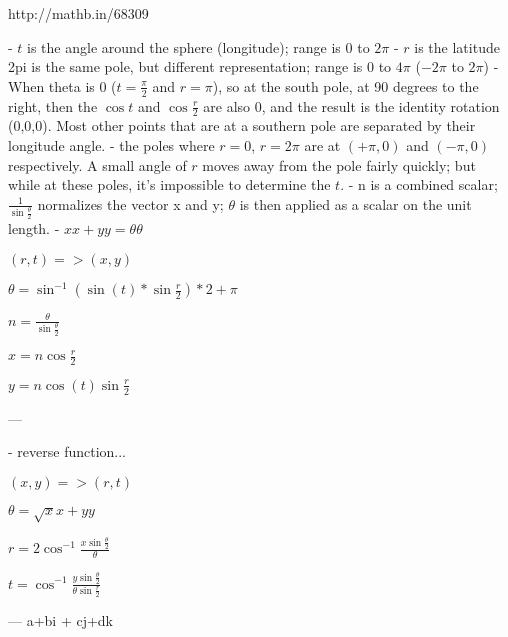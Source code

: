 http://mathb.in/68309

- $t$ is the angle around the sphere (longitude); range is $0$ to $2\pi$ 
- $r$ is the latitude 2pi is the same pole, but different representation; range is $0$ to $4\pi$ ($-2\pi$ to $2\pi$)
- When theta is 0 ($t=\frac \pi 2$ and $r=\pi$), so at the south pole, at 90 degrees to the right, then the $\cos t$ and $\cos \frac r 2 $ are also 0, and the result is the identity rotation (0,0,0).  Most other points that are at a southern pole are separated by their longitude angle.  
- the poles where $r=0$, $r=2\pi$ are at $(+\pi,0)$ and $(-\pi,0)$  respectively.  A small angle of $r$ moves away from the pole fairly quickly; but while at these poles, it's impossible to determine the $t$.
- n is a combined scalar; $\frac 1 {\sin \frac \theta 2} $ normalizes the vector x and y; $\theta$ is then applied as a scalar on the unit length.
- $xx+yy=\theta\theta$

$ (r,t) => (x,y) $

$\theta = \sin^{-1}( \sin(t)*\sin \frac r 2 )*2 + \pi$

$n = \frac \theta { \sin \frac \theta 2 }$ 

$ x = n \cos \frac r 2 $

$ y = n \cos(t)   \sin {\frac r 2}$
			
---

- reverse function... 

$ (x,y)=> (r,t)$

$ \theta = \sqrt xx+yy $

$ r = 2 \cos^{-1} {\frac {x \sin \frac \theta 2  } \theta  }$

$ t = \cos ^{-1} {\frac { y \sin {\frac \theta 2} } {\theta \sin {\frac r 2 } } }$


---
a+bi + cj+dk

